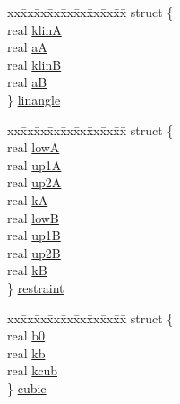 \begin{DoxyCompactItemize}
\begin{tabbing}
\end{tabbing}\item 
\begin{tabbing}
xx\=xx\=xx\=xx\=xx\=xx\=xx\=xx\=xx\=\kill
struct \{\\
\>real \hyperlink{uniont__iparams_a7a5fa9928ee64a7094141cdf333b66c8}{klinA}\\
\>real \hyperlink{uniont__iparams_a3fe9cc5faaa995f6dc9e3ecb171cde5c}{aA}\\
\>real \hyperlink{uniont__iparams_aabc927d2573a0482e6767d7123ec8e2e}{klinB}\\
\>real \hyperlink{uniont__iparams_ad81a551a8c0c84cb54663e7c6052bf59}{aB}\\
\} \hyperlink{uniont__iparams_adb8bf47e8235e4bfa6fd36d603d25750}{linangle}\\

\end{tabbing}\item 
\begin{tabbing}
xx\=xx\=xx\=xx\=xx\=xx\=xx\=xx\=xx\=\kill
struct \{\\
\>real \hyperlink{uniont__iparams_ae1a554426a99ca0625fe5a9cca97403a}{lowA}\\
\>real \hyperlink{uniont__iparams_a9648fb3cd3064ad39200018b9466a6ee}{up1A}\\
\>real \hyperlink{uniont__iparams_a3d080bf1b8f0adbcde996636d21aec5b}{up2A}\\
\>real \hyperlink{uniont__iparams_ab13d91373ce6d97d0c3a8e7b9886b0af}{kA}\\
\>real \hyperlink{uniont__iparams_a32dc037716b3c880bca3d5947a923f66}{lowB}\\
\>real \hyperlink{uniont__iparams_a3f8d79df8e4b64efa3807d0ca17fcb06}{up1B}\\
\>real \hyperlink{uniont__iparams_a177c29d3a2a551309bc5263d3fac53a6}{up2B}\\
\>real \hyperlink{uniont__iparams_abda3baea609874bcf28f8a28b6e0a451}{kB}\\
\} \hyperlink{uniont__iparams_a3b0cd5fda89967cd20ef0b7a630466f1}{restraint}\\

\end{tabbing}\item 
\begin{tabbing}
xx\=xx\=xx\=xx\=xx\=xx\=xx\=xx\=xx\=\kill
struct \{\\
\>real \hyperlink{uniont__iparams_aaee3232f3405dba9597d086ef9905c32}{b0}\\
\>real \hyperlink{uniont__iparams_a6c8fbc5362283145021c254452016202}{kb}\\
\>real \hyperlink{uniont__iparams_ae00b24476936dcae2fcb8ac07b7de3b0}{kcub}\\
\} \hyperlink{uniont__iparams_adf74092c97a046e02db8f5c4dc57eb35}{cubic}\\


\end{tabbing}
\end{DoxyCompactItemize}
